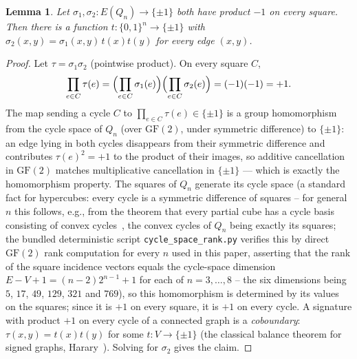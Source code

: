 \documentclass[12pt,a4paper]{article}
\newtheorem{lemma}[theorem]{Lemma}
\theoremstyle{definition}
\begin{document}
\begin{lemma}\label{lem:switching}
Let $\sigma_1,\sigma_2:E(Q_n)\to\{\pm1\}$ both have product $-1$ on every
square. Then there is a function $t:\{0,1\}^n\to\{\pm1\}$ with
$\sigma_2(x,y)=\sigma_1(x,y)\,t(x)t(y)$ for every edge $(x,y)$.
\end{lemma}
\begin{proof}
Let $\tau=\sigma_1\sigma_2$ (pointwise product). On every square $C$,
\[
\prod_{e\in C}\tau(e)
=\Bigl(\prod_{e\in C}\sigma_1(e)\Bigr)\Bigl(\prod_{e\in C}\sigma_2(e)\Bigr)
=(-1)(-1)=+1.
\]
The map sending a cycle $C$ to $\prod_{e\in C}\tau(e)\in\{\pm1\}$ is a group
homomorphism from the cycle space of $Q_n$ (over $\mathrm{GF}(2)$, under
symmetric difference) to $\{\pm1\}$: an edge lying in both cycles
disappears from their symmetric difference and contributes
$\tau(e)^2=+1$ to the product of their images, so additive cancellation
in $\mathrm{GF}(2)$ matches multiplicative cancellation in $\{\pm1\}$
--- which is exactly the homomorphism property. The
squares of $Q_n$ generate its cycle space (a standard fact for hypercubes:
every cycle is a symmetric difference of squares -- for general $n$ this
follows, e.g., from the theorem that every partial cube has a cycle basis
consisting of convex cycles~\cite{HLS14}, the convex cycles of $Q_n$ being
exactly its squares; the bundled
deterministic script \texttt{cycle\_space\_rank.py} verifies this by
direct $\mathrm{GF}(2)$ rank computation for every $n$ used in this
paper, asserting that the rank of the square incidence vectors equals
the cycle-space dimension $E-V+1=(n-2)2^{n-1}+1$ for each of
$n=3,\ldots,8$ -- the six dimensions being $5$, $17$, $49$, $129$,
$321$ and $769$), so this homomorphism is
determined by its values on the squares; since it is $+1$ on every square,
it is $+1$ on every cycle. A signature with product $+1$ on every cycle of
a connected graph is a \emph{coboundary}: $\tau(x,y)=t(x)t(y)$ for some
$t:V\to\{\pm1\}$ (the classical balance theorem for signed graphs,
Harary~\cite{Har53}). Solving for $\sigma_2$ gives the claim.
\end{proof}
\end{document}

